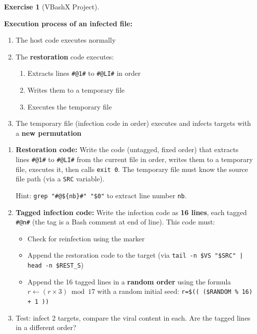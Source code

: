 \documentclass[a4paper,11pt]{article}
\theoremstyle{plain}
\theoremstyle{definition}
\newtheorem{exercice}{Exercise}
\begin{document}
\begin{exercice}[VBashX Project]
\begin{rappel}
\medskip
\textbf{Execution process of an infected file:}
\begin{enumerate}
    \item The host code executes normally
    \item The \textbf{restoration} code executes:
    \begin{enumerate}
        \item Extracts lines \texttt{\#@1\#} to \texttt{\#@LI\#} in order
        \item Writes them to a temporary file
        \item Executes the temporary file
    \end{enumerate}
    \item The temporary file (infection code in order) executes and infects targets with a \textbf{new permutation}
\end{enumerate}
\end{rappel}

\begin{enumerate}
\item[\textbf{4a)}] \textbf{Restoration code:} Write the code (untagged, fixed order) that extracts lines \texttt{\#@1\#} to \texttt{\#@LI\#} from the current file in order, writes them to a temporary file, executes it, then calls \texttt{exit 0}. The temporary file must know the source file path (via a \texttt{SRC} variable).

Hint: \texttt{grep "\#@\$\{nb\}\#" "\$0"} to extract line number \texttt{nb}.

\item[\textbf{4b)}] \textbf{Tagged infection code:} Write the infection code as \textbf{16 lines}, each tagged \texttt{\#@n\#} (the tag is a Bash comment at end of line). This code must:
\begin{itemize}
    \item Check for reinfection using the marker
    \item Append the restoration code to the target (via \texttt{tail -n \$VS "\$SRC" | head -n \$REST\_S})
    \item Append the 16 tagged lines in a \textbf{random order} using the formula $r \leftarrow (r \times 3) \bmod 17$ with a random initial seed: \texttt{r=\$(( (\$RANDOM \% 16) + 1 ))}
\end{itemize}

\item[\textbf{4c)}] Test: infect 2 targets, compare the viral content in each. Are the tagged lines in a different order?


\end{enumerate}
\end{exercice}
\end{document}
